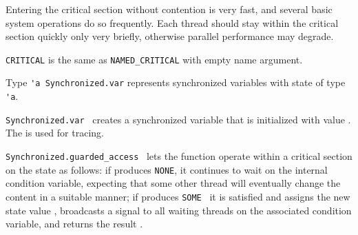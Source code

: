 \begin{isabellebody}
\begin{isamarkuptext}
\begin{description}
  Entering the critical section without contention is very fast, and
  several basic system operations do so frequently.  Each thread
  should stay within the critical section quickly only very briefly,
  otherwise parallel performance may degrade.

  \item \verb|CRITICAL| is the same as \verb|NAMED_CRITICAL| with empty
  name argument.

  \item Type \verb|'a Synchronized.var| represents synchronized
  variables with state of type \verb|'a|.

  \item \verb|Synchronized.var|~ creates a synchronized
  variable that is initialized with value .  The  is used for tracing.

  \item \verb|Synchronized.guarded_access|~ lets the
  function  operate within a critical section on the state
   as follows: if  produces \verb|NONE|, it
  continues to wait on the internal condition variable, expecting that
  some other thread will eventually change the content in a suitable
  manner; if  produces \verb|SOME|~ it is
  satisfied and assigns the new state value , broadcasts a
  signal to all waiting threads on the associated condition variable,
  and returns the result .

  \end{description}


\end{isamarkuptext}
\end{isabellebody}
